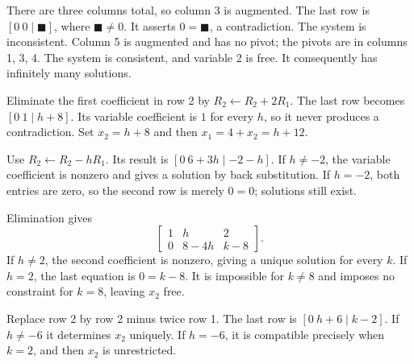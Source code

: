 There are three columns total, so column 3 is augmented. The last row
is $[0\ 0\mid\blacksquare]$, where $\blacksquare\ne0$.
It asserts $0=\blacksquare$, a contradiction. The system is inconsistent.
Column 5 is augmented and has no pivot; the pivots are in columns 1,
3, 4. The system is consistent, and variable 2 is free. It consequently
has infinitely many solutions.

Eliminate the first coefficient in row 2 by $R_2\leftarrow R_2+2R_1$.
The last row becomes $[0\ 1\mid h+8]$. Its variable coefficient is $1$
for every $h$, so it never produces a contradiction. Set $x_2=h+8$
and then $x_1=4+x_2=h+12$.

Use $R_2\leftarrow R_2-hR_1$. Its result is
$[0\ 6+3h\mid-2-h]$. If $h\ne-2$, the variable coefficient is
nonzero and gives a solution by back substitution. If $h=-2$, both
entries are zero, so the second row is merely $0=0$; solutions still exist.

Elimination gives
\[
\begin{bmatrix}1&h&2\\0&8-4h&k-8\end{bmatrix}.
\]
If $h\ne2$, the second coefficient is nonzero, giving a unique solution
for every $k$. If $h=2$, the last equation is $0=k-8$.
It is impossible for $k\ne8$ and imposes no constraint for $k=8$,
leaving $x_2$ free.

Replace row 2 by row 2 minus twice row 1. The last row is
$[0\ h+6\mid k-2]$. If $h\ne-6$ it determines $x_2$ uniquely.
If $h=-6$, it is compatible precisely when $k=2$, and then $x_2$
is unrestricted.

